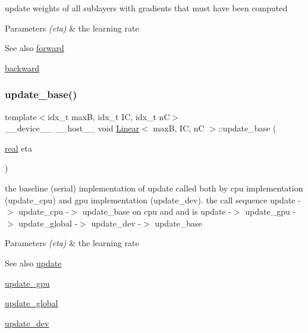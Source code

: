 update weights of all sublayers with gradients that must have been computed 


\begin{DoxyParams}{Parameters}
{\em (eta)} & the learning rate \\
\hline
\end{DoxyParams}
\begin{DoxySeeAlso}{See also}
\hyperlink{structLinear_aed0294f2d1c2013f66d89a52474352e5}{forward} 

\hyperlink{structLinear_aeaa39d38b876fbd70794621955193fd3}{backward} 
\end{DoxySeeAlso}
\mbox{\label{structLinear_aa59e1addd962ac7a70993229534ab899}} 
\subsubsection{\texorpdfstring{update\+\_\+base()}{update\_base()}}
{\footnotesize\ttfamily template$<$idx\+\_\+t maxB, idx\+\_\+t IC, idx\+\_\+t nC$>$ \\
\+\_\+\+\_\+device\+\_\+\+\_\+ \+\_\+\+\_\+host\+\_\+\+\_\+ void \hyperlink{structLinear}{Linear}$<$ maxB, IC, nC $>$\+::update\+\_\+base (\begin{DoxyParamCaption}\item[{\hyperlink{vgg__util_8h_a1082d08aaa761215ec83e7149f27ad16}{real}}]{eta }\end{DoxyParamCaption})\hspace{0.3cm}{\ttfamily [inline]}}



the baseline (serial) implementation of update called both by cpu implementation (update\+\_\+cpu) and gpu implementation (update\+\_\+dev). the call sequence update -\/$>$ update\+\_\+cpu -\/$>$ update\+\_\+base on cpu and and is update -\/$>$ update\+\_\+gpu -\/$>$ update\+\_\+global -\/$>$ update\+\_\+dev -\/$>$ update\+\_\+base 


\begin{DoxyParams}{Parameters}
{\em (eta)} & the learning rate \\
\hline
\end{DoxyParams}
\begin{DoxySeeAlso}{See also}
\hyperlink{structLinear_a828a72af0a1ccac904325ee280dbefa4}{update} 

\hyperlink{structLinear_a8ca71565731b9d8c3ba552578c61753a}{update\+\_\+gpu} 

\hyperlink{linear_8h_a810703be28422bb9483665cbdbafd968}{update\+\_\+global} 

\hyperlink{structLinear_ad45413b0c13ca0ca89db6a3217a8b00b}{update\+\_\+dev} 
\end{DoxySeeAlso}
\mbox{\label{structLinear_afabe5b3388c37c5b02e9f7ca7f0cd686}} 
